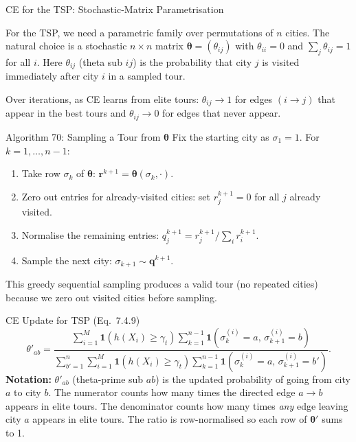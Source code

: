 \documentclass[aspectratio=169,10pt]{beamer}
\newcommand{\btheta}{\boldsymbol{\theta}}
\begin{document}
\begin{frame}[allowframebreaks]{CE for the TSP: Stochastic-Matrix Parametrisation}

For the TSP, we need a parametric family over permutations of $n$ cities.
The natural choice is a stochastic $n \times n$ matrix
$\btheta = (\theta_{ij})$ with $\theta_{ii} = 0$ and $\sum_j \theta_{ij} = 1$
for all $i$.  Here $\theta_{ij}$ (theta sub $ij$) is the probability that
city $j$ is visited immediately after city $i$ in a sampled tour.

Over iterations, as CE learns from elite tours: $\theta_{ij} \to 1$ for
edges $(i \to j)$ that appear in the best tours and $\theta_{ij} \to 0$ for
edges that never appear.

\begin{block}{Algorithm 70: Sampling a Tour from $\btheta$}
  Fix the starting city as $\sigma_1 = 1$.  For $k = 1, \ldots, n-1$:
  \begin{enumerate}
    \item Take row $\sigma_k$ of $\btheta$: $\mathbf{r}^{k+1} = \btheta(\sigma_k, \cdot)$.
    \item Zero out entries for already-visited cities:
      set $r^{k+1}_j = 0$ for all $j$ already visited.
    \item Normalise the remaining entries: $q^{k+1}_j = r^{k+1}_j / \sum_i r^{k+1}_i$.
    \item Sample the next city: $\sigma_{k+1} \sim \mathbf{q}^{k+1}$.
  \end{enumerate}
  This greedy sequential sampling produces a valid tour (no repeated cities)
  because we zero out visited cities before sampling.
\end{block}

\begin{block}{CE Update for TSP (Eq.~7.4.9)}
  \[
    \theta'_{ab}
    = \frac{\displaystyle\sum_{i=1}^M \mathbf{1}(h(X_i)\ge\gamma_t)
             \sum_{k=1}^{n-1}\mathbf{1}(\sigma_k^{(i)}=a,\,\sigma_{k+1}^{(i)}=b)}
           {\displaystyle\sum_{b'=1}^n \sum_{i=1}^M \mathbf{1}(h(X_i)\ge\gamma_t)
             \sum_{k=1}^{n-1}\mathbf{1}(\sigma_k^{(i)}=a,\,\sigma_{k+1}^{(i)}=b')}.
  \]
  \textbf{Notation:} $\theta'_{ab}$ (theta-prime sub $ab$) is the updated
  probability of going from city $a$ to city $b$.  The numerator counts how
  many times the directed edge $a \to b$ appears in elite tours.  The
  denominator counts how many times \emph{any} edge leaving city $a$ appears
  in elite tours.  The ratio is row-normalised so each row of $\btheta'$
  sums to 1.
\end{block}


\end{frame}
\end{document}
